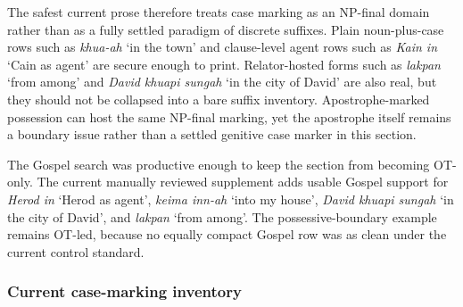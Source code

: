 \documentclass[
  11pt,
  a4paper,
]{article}
\newcommand{\tdim}[1]{\textit{#1}}
\newcommand{\glossquote}[1]{`#1'}
\begin{document}
The safest current prose therefore treats case marking as an NP-final
domain rather than as a fully settled paradigm of discrete suffixes.
Plain noun-plus-case rows such as \tdim{khua-ah}
\glossquote{in the town} and clause-level agent rows such as
\tdim{Kain in} \glossquote{Cain as agent} are secure enough to print.
Relator-hosted forms such as \tdim{lakpan} \glossquote{from among} and
\tdim{David khuapi sungah} \glossquote{in the city of David} are also
real, but they should not be collapsed into a bare suffix inventory.
Apostrophe-marked possession can host the same NP-final marking, yet the
apostrophe itself remains a boundary issue rather than a settled
genitive case marker in this section.

The Gospel search was productive enough to keep the section from
becoming OT-only. The current manually reviewed supplement adds usable
Gospel support for \tdim{Herod in} \glossquote{Herod as agent},
\tdim{keima inn-ah} \glossquote{into my house},
\tdim{David khuapi sungah} \glossquote{in the city of David}, and
\tdim{lakpan} \glossquote{from among}. The possessive-boundary example
remains OT-led, because no equally compact Gospel row was as clean under
the current control standard.

\subsubsection{Current case-marking
inventory}\label{current-case-marking-inventory}
\end{document}
